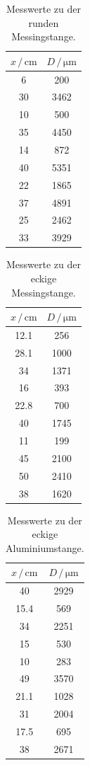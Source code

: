 \begin{table}
	\centering
	\caption{Messwerte zu der runden Messingstange.} 
	\label{tab:vana} 
	\begin{tabular}{c c}
	\toprule
	$x \, / \, \si{\centi\meter}$ & $D \, / \, \si{\micro\meter}$\\
	\midrule
    6      &     200 \\
    30     &    3462 \\
    10     &     500 \\
    35     &    4450 \\
    14     &     872 \\
    40     &    5351 \\
    22     &    1865 \\
    37     &    4891 \\
    25     &    2462 \\
    33     &    3929 \\
\bottomrule
	\end{tabular}
\end{table}

\begin{table}
	\centering
	\caption{Messwerte zu der eckige Messingstange.} 
	\label{tab:vana} 
	\begin{tabular}{c c}
	\toprule
	$x \, / \, \si{\centi\meter}$ & $D \, / \, \si{\micro\meter}$\\
	\midrule
    12.1  &      256\\
    28.1  &     1000\\
    34    &     1371\\
    16    &      393\\
    22.8  &      700\\
    40    &     1745\\
    11    &      199\\
    45    &     2100\\
    50    &     2410\\
    38    &     1620\\
\bottomrule
	\end{tabular}
\end{table}

\begin{table}
	\centering
	\caption{Messwerte zu der eckige Aluminiumstange.} 
	\label{tab:vana} 
	\begin{tabular}{c c}
	\toprule
	$x \, / \, \si{\centi\meter}$ & $D \, / \, \si{\micro\meter}$\\
	\midrule
    40     &    2929\\
    15.4   &     569\\
    34     &    2251\\
    15     &     530\\
    10     &     283\\
    49     &    3570\\
    21.1   &    1028\\
    31     &    2004\\
    17.5   &     695\\
    38     &    2671\\
\bottomrule
	\end{tabular}
\end{table}

